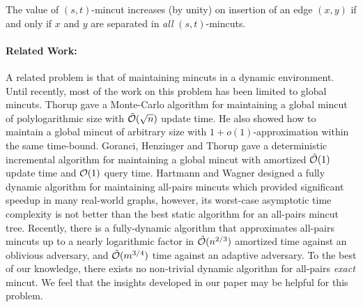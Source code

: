  \begin{fact}
\label{fact:(x,y)-insertion}
The value of $(s,t)$-mincut increases (by unity) on insertion of an edge $(x,y)$ if and only if $x$ and $y$ are separated in \textit{all} $(s,t)$-mincuts.
\end{fact}






\paragraph{Related Work:} A related problem is that of maintaining mincuts in a dynamic environment. Until recently, most of the work on this problem has been limited to global mincuts. Thorup \cite{DBLP:journals/combinatorica/Thorup07} gave a Monte-Carlo algorithm for maintaining a global mincut of polylogarithmic size with ${\tilde {\cal O}}(\sqrt{n})$ update time.  He also showed how to maintain a global mincut of arbitrary size with $1+o(1)$-approximation within the same time-bound. Goranci, Henzinger and Thorup \cite{DBLP:journals/talg/GoranciHT18} gave a deterministic incremental algorithm for maintaining a global mincut with amortized ${\tilde{\cal O}}(1)$ update time and ${\cal O}(1)$ query time. Hartmann and Wagner \cite{DBLP:conf/isaac/HartmannW12} designed a fully dynamic algorithm for maintaining all-pairs mincuts  which provided significant speedup in many real-world graphs, however, its worst-case asymptotic time complexity is not better than the best static algorithm for an all-pairs mincut tree. Recently, there is a fully-dynamic algorithm \cite{DBLP:journals/corr/abs-2005-02368} that approximates all-pairs mincuts up to a nearly logarithmic factor in ${\tilde{\cal O}}(n^{2/3} )$ amortized time against an oblivious adversary, and ${\tilde{\cal O}}(m^{3/4} )$ time against an adaptive adversary. To the best of our knowledge, there exists no non-trivial dynamic algorithm for all-pairs \textit{exact} mincut. We feel that the insights developed in our paper may be helpful for this problem.

